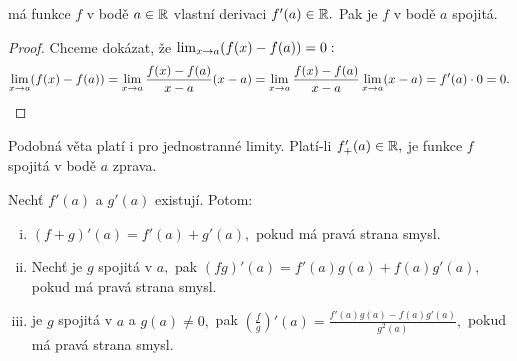 \begin{theorem}
    \label{th:derivacespojitost}
    \Necht má funkce $f$ v bodě $a \in \mathbb{R}$ vlastní derivaci $f'(a) \in \mathbb{R}.$ Pak
    je $f$ v bodě $a$ spojitá.
\end{theorem}

\begin{proof}
    Chceme dokázat, že $\lim_{x \to a} (f(x) - f(a)) = 0:$
    $$\lim_{x \to a} (f(x) - f(a)) = \lim_{x \to a} \frac{f(x) - f(a)}{x-a}(x-a) =
    \lim_{x \to a} \frac{f(x) - f(a)}{x-a} \lim_{x \to a} (x-a) = f'(a) \cdot 0 = 0.$$
\end{proof}

\begin{remark}
    \label{rm:jednostrannaderivacespojitost}
    Podobná věta platí i pro jednostranné limity. Platí-li $f'_+(a) \in \mathbb{R},$
    je funkce $f$ spojitá v bodě $a$ zprava.
\end{remark}

\begin{theorem}
    Nechť $f'(a)$ a $g'(a)$ existují. Potom:
    \begin{enumerate}[i.]
        \item $(f+g)'(a) = f'(a) + g'(a),$ pokud má pravá strana smysl.
        \item Nechť je $g$ spojitá v $a,$ pak $(fg)'(a) = f'(a)g(a) + f(a)g'(a),$
            pokud má pravá strana smysl.
        \item \Necht je $g$ spojitá v $a$ a $g(a) \neq 0,$ pak 
            $\left(\frac{f}{g}\right)'(a) = \frac{f'(a)g(a) - f(a)g'(a)}{g^2(a)},$
            pokud má pravá strana smysl.
    \end{enumerate}
\end{theorem}

